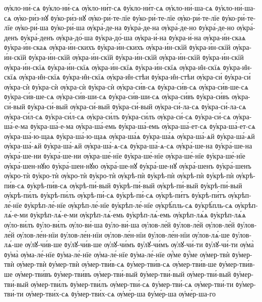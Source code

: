 {ѹ҆кло-ни́-сѧ
ᲂу҆кло-ни́-сѧ
ѹ҆кло-ни́т-сѧ
ᲂу҆кло-ни́т-сѧ
ѹ҆кло-ни́-ша-сѧ
ᲂу҆кло-ни́-ша-сѧ
ѹ҆ко-ри́з-нꙋ
ᲂу҆ко-ри́з-нꙋ
ѹ҆ко-ри́-те-лїе
ᲂу҆ко-ри́-те-лїе
ѹ҆ко-ри́-те-лїе
ᲂу҆ко-ри́-те-лїе
ѹ҆ко-ри́-ша
ᲂу҆ко-ри́-ша
ѹ҆кра́-де-на
ᲂу҆кра́-де-на
ѹ҆кра́-де-но
ᲂу҆кра́-де-но
ѹ҆кра́-денъ
ᲂу҆кра́-денъ
ѹ҆кра-до́-ша
ᲂу҆кра-до́-ша
ѹ҆кра-и́-на
ᲂу҆кра-и́-на
ѹ҆кра-и́н-скаѧ
ᲂу҆кра-и́н-скаѧ
ѹ҆кра-и́н-скихъ
ᲂу҆кра-и́н-скихъ
ѹ҆кра-и́н-скїй
ᲂу҆кра-и́н-скїй
ѹ҆кра-и́н-скїй
ᲂу҆кра-и́н-скїй
ѹ҆кра-и́н-скїй
ᲂу҆кра-и́н-скїй
ѹ҆кра-и́н-скїй
ᲂу҆кра-и́н-скїй
ѹ҆кра-и́н-скїѧ
ᲂу҆кра-и́н-скїѧ
ѹ҆кра-и́н-скїѧ
ᲂу҆кра-и́н-скїѧ
ѹ҆кра-и̑н-скїѧ
ᲂу҆кра-и̑н-скїѧ
ѹ҆кра-и̑н-скїѧ
ᲂу҆кра-и̑н-скїѧ
ѹ҆кра-и̑н-стѣи
ᲂу҆кра-и̑н-стѣи
ѹ҆кра-си́
ᲂу҆кра-си́
ѹ҆кра-сѝ
ᲂу҆кра-сѝ
ѹ҆кра-сѝ
ᲂу҆кра-сѝ
ѹ҆кра-си́в-сѧ
ᲂу҆кра-си́в-сѧ
ѹ҆кра-си́в-ше-сѧ
ᲂу҆кра-си́в-ше-сѧ
ѹ҆кра-си́в-ши-сѧ
ᲂу҆кра-си́в-ши-сѧ
ѹ҆кра-си́въ
ᲂу҆кра-си́въ
ѹ҆кра-си́-вый
ᲂу҆кра-си́-вый
ѹ҆кра-си́-вый
ᲂу҆кра-си́-вый
ѹ҆кра-си́-ла-сѧ
ᲂу҆кра-си́-ла-сѧ
ѹ҆кра-си́л-сѧ
ᲂу҆кра-си́л-сѧ
ѹ҆кра-си́лъ
ᲂу҆кра-си́лъ
ѹ҆кра-си́-сѧ
ᲂу҆кра-си́-сѧ
ѹ҆кра-ша́-е-ма
ᲂу҆кра-ша́-е-ма
ѹ҆кра-ша́-емь
ᲂу҆кра-ша́-емь
ѹ҆кра-ша́-ет-сѧ
ᲂу҆кра-ша́-ет-сѧ
ѹ҆кра-ша́-ю-щаѧ
ᲂу҆кра-ша́-ю-щаѧ
ѹ҆кра-ша́ѧ
ᲂу҆кра-ша́ѧ
ѹ҆кра-ша́-ѧй
ᲂу҆кра-ша́-ѧй
ѹ҆кра-ша́-ѧй
ᲂу҆кра-ша́-ѧй
ѹ҆кра-ша́-ѧ-сѧ
ᲂу҆кра-ша́-ѧ-сѧ
ѹ҆кра́-ше-на
ᲂу҆кра́-ше-на
ѹ҆кра́-ше-ни
ᲂу҆кра́-ше-ни
ѹ҆кра-ше́-нїе
ᲂу҆кра-ше́-нїе
ѹ҆кра-ше́-нїе
ᲂу҆кра-ше́-нїе
ѹ҆кра́-шен-нꙋю
ᲂу҆кра́-шен-нꙋю
ѹ҆кра́-ше-нꙋ
ᲂу҆кра́-ше-нꙋ
ѹ҆кра́-шенъ
ᲂу҆кра́-шенъ
ѹ҆кро-тѝ
ᲂу҆кро-тѝ
ѹ҆кро-тѝ
ᲂу҆кро-тѝ
ѹ҆крѣ-пѝ
ᲂу҆крѣ-пѝ
ѹ҆крѣ-пѝ
ᲂу҆крѣ-пѝ
ѹ҆крѣ-пи́в-сѧ
ᲂу҆крѣ-пи́в-сѧ
ѹ҆крѣ-пи́-вый
ᲂу҆крѣ-пи́-вый
ѹ҆крѣ-пи́-вый
ᲂу҆крѣ-пи́-вый
ѹ҆крѣ-пи́лъ
ᲂу҆крѣ-пи́лъ
ѹ҆крѣ-пи́-сѧ
ᲂу҆крѣ-пи́-сѧ
ѹ҆крѣ-пи́тъ
ᲂу҆крѣ-пи́тъ
ѹ҆крѣп-ле́-нїе
ᲂу҆крѣп-ле́-нїе
ѹ҆крѣп-ле́-нїе
ᲂу҆крѣп-ле́-нїе
ѹ҆крѣ́пль-сѧ
ᲂу҆крѣ́пль-сѧ
ѹ҆крѣп-лѧ́-е-ми
ᲂу҆крѣп-лѧ́-е-ми
ѹ҆крѣп-лѧ́-емь
ᲂу҆крѣп-лѧ́-емь
ѹ҆крѣп-лѧ́ѧ
ᲂу҆крѣп-лѧ́ѧ
ѹ҆ло-ви́лъ
ᲂу҆ло-ви́лъ
ѹ҆ло-ви́-ша
ᲂу҆ло-ви́-ша
ѹ҆лов-ле́й
ᲂу҆лов-ле́й
ѹ҆лов-ле́й
ᲂу҆лов-ле́й
ѹ҆лов-ле́н-нїи
ᲂу҆лов-ле́н-нїи
ѹ҆лов-ле́н-нїи
ᲂу҆лов-ле́н-нїи
ѹ҆лов-лѧ́-ше
ᲂу҆лов-лѧ́-ше
ѹ҆лꙋ-чи́в-ше
ᲂу҆лꙋ-чи́в-ше
ѹ҆лꙋ-чи́мъ
ᲂу҆лꙋ-чи́мъ
ѹ҆лꙋ-чи́-ти
ᲂу҆лꙋ-чи́-ти
ѹ҆ма̀
ᲂу҆ма̀
ѹ҆ма-ле́-нїе
ᲂу҆ма-ле́-нїе
ѹ҆ма-ле́-нїе
ᲂу҆ма-ле́-нїе
ѹ҆́ме
ᲂу҆́ме
ѹ҆мер-твѝ
ᲂу҆мер-твѝ
ѹ҆мер-твѝ
ᲂу҆мер-твѝ
ѹ҆мер-тви́в-сѧ
ᲂу҆мер-тви́в-сѧ
ѹ҆мер-тви́в-ше
ᲂу҆мер-тви́в-ше
ѹ҆мер-тви́въ
ᲂу҆мер-тви́въ
ѹ҆мер-тви́-вый
ᲂу҆мер-тви́-вый
ѹ҆мер-тви́-вый
ᲂу҆мер-тви́-вый
ѹ҆мер-тви́лъ
ᲂу҆мер-тви́лъ
ѹ҆мер-тви́-сѧ
ᲂу҆мер-тви́-сѧ
ѹ҆мер-тви́-ти
ᲂу҆мер-тви́-ти
ѹ҆мер-тви́х-сѧ
ᲂу҆мер-тви́х-сѧ
ѹ҆ме́р-ша
ᲂу҆ме́р-ша
ѹ҆ме́р-ша-го
}
